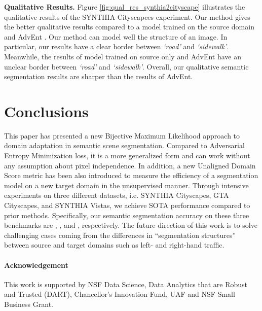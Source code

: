 \documentclass[10pt,twocolumn,letterpaper]{article}
\begin{document}
\textbf{Qualitative Results.} Figure \ref{fig:qual_res_synthia2cityscape} illustrates the qualitative results of the SYNTHIA  Cityscapces experiment. Our method gives the better qualitative results compared to a model trained on the source domain and AdvEnt \cite{vu2019advent}. 
Our method can model well the structure of an image. In particular, our results have a clear border between \textit{`road'} and \textit{`sidewalk'}. Meanwhile, the results of model trained on source only and AdvEnt have an unclear border between \textit{`road'} and \textit{`sidewalk'}. Overall, our qualitative semantic segmentation results are sharper than the results of AdvEnt.




\vspace{-2mm}
\section{Conclusions}

This paper has presented a new Bijective Maximum Likelihood approach to domain adaptation in semantic scene segmentation. Compared to Adversarial Entropy Minimization loss, it is a more generalized form and can work without any assumption about pixel independence. 
In addition, a new Unaligned Domain Score metric has been also introduced to measure the efficiency of a segmentation model on a new target domain in the unsupervised manner. 
Through intensive experiments on three different datasets, i.e. SYNTHIA  Cityscapes, GTA  Cityscapes, and SYNTHIA  Vistas, we achieve SOTA performance compared to prior methods. Specifically, our semantic segmentation accuracy on these three benchmarks are , , and , respectively.
The future direction of this work is to solve challenging cases coming from the differences in ``segmentation structures'' between source and target domains such as left- and right-hand traffic.



\vspace{-4mm}
\paragraph{Acknowledgement} This work is supported by NSF Data Science, Data Analytics that are Robust and Trusted (DART), Chancellor's Innovation Fund, UAF and NSF Small Business Grant.


{\small


}
\end{document}
